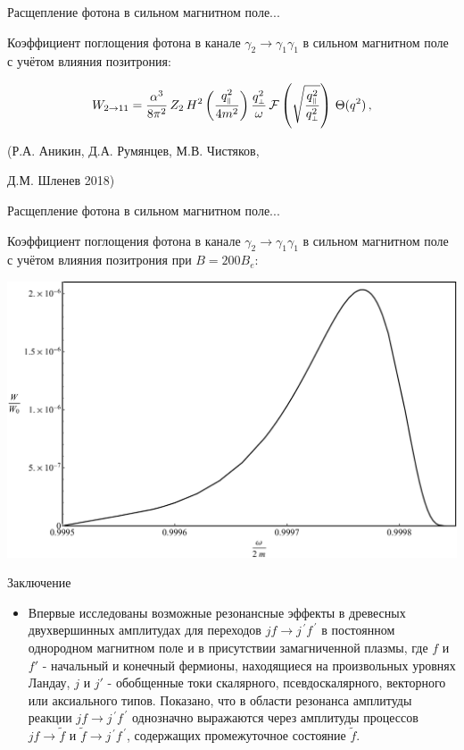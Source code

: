 \documentclass{beamer}
\def\mprp{\mbox{\tiny $\bot$}}
\def\mprl{\mbox{\tiny $\|$}}
\begin{document}
\begin{frame}{Расщепление фотона в сильном магнитном поле...}
\begin{center}
Коэффициент поглощения фотона в канале $\gamma_2 \to\gamma_1 \gamma_1$ в сильном 
магнитном поле с учётом влияния позитрония:

$$W_{2 \to 11} = 
\frac{\alpha^3}{8\pi^2}\, Z_2\,  H^2\left(\frac{q^2_{\mprl}}{4m^2}\right)
\frac{q_{\mprp}^2}{\omega} \, {\cal F}\left
(\sqrt{\frac{q_{\mprl}^2}{q_{\mprp}^2}} \right) \, \Theta (q^2)\, ,$$

(Р.А. Аникин, Д.А. Румянцев, М.В. Чистяков, 

Д.М. Шленев 2018)
\end{center}
\end{frame}
\begin{frame}{Расщепление фотона в сильном магнитном поле...}
\begin{center}
Коэффициент поглощения фотона в канале $\gamma_2 \to\gamma_1 \gamma_1$ в сильном 
магнитном поле с учётом влияния позитрония при $B = 200 B_e$:

\includegraphics[scale=0.28]{211pos.pdf}

\end{center}
\end{frame}
\begin{frame}{Заключение}
\begin{itemize}

\item Впервые исследованы возможные резонансные эффекты в древесных двухвершинных 
амплитудах для переходов $jf\to j^{\,\prime} f^{\,\prime}$ в постоянном однородном 
магнитном поле и в присутствии замагниченной плазмы, где  $f$ и $f'$ - начальный и 
конечный фермионы, находящиеся на произвольных уровнях Ландау, $j$ и $j'$ - 
обобщенные токи скалярного, псевдоскалярного, векторного или  аксиального 
типов. Показано, что в области резонанса амплитуды реакции $jf\to j^{\,\prime} f^{\,\prime}$ 
однозначно выражаются через амплитуды процессов $jf\to \tilde f$ и  
$\tilde f\to j^{\,\prime} f^{\,\prime}$, содержащих промежуточное состояние $\tilde f$.


\end{itemize}
\end{frame}
\end{document}
